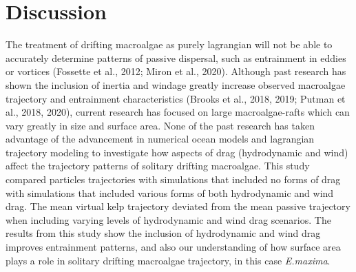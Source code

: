 \documentclass[
]{article}
\begin{document}
\hypertarget{discussion}{%
\section{Discussion}\label{discussion}}

The treatment of drifting macroalgae as purely lagrangian will not be
able to accurately determine patterns of passive dispersal, such as
entrainment in eddies or vortices (Fossette et al., 2012; Miron et al.,
2020). Although past research has shown the inclusion of inertia and
windage greatly increase observed macroalgae trajectory and entrainment
characteristics (Brooks et al., 2018, 2019; Putman et al., 2018, 2020),
current research has focused on large macroalgae-rafts which can vary
greatly in size and surface area. None of the past research has taken
advantage of the advancement in numerical ocean models and lagrangian
trajectory modeling to investigate how aspects of drag (hydrodynamic and
wind) affect the trajectory patterns of solitary drifting macroalgae.
This study compared particles trajectories with simulations that
included no forms of drag with simulations that included various forms
of both hydrodynamic and wind drag. The mean virtual kelp trajectory
deviated from the mean passive trajectory when including varying levels
of hydrodynamic and wind drag scenarios. The results from this study
show the inclusion of hydrodynamic and wind drag improves entrainment
patterns, and also our understanding of how surface area plays a role in
solitary drifting macroalgae trajectory, in this case \emph{E.maxima}.
\end{document}
